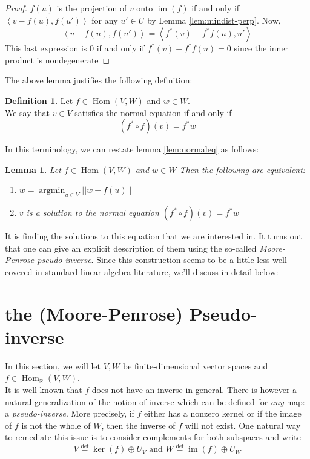 \documentclass{book}
\theoremstyle{plain}
\newtheorem{lemma}[corollary]{Lemma}
\theoremstyle{definition}
\newtheorem{definition}[corollary]{Definition}
\DeclareMathOperator{\argmin}{argmin}
\newcommand{\bl}[2]{\left\langle #1,#2\right\rangle}
\renewcommand{\d}[1]{\mathbb{#1}}
\newcommand{\define}{\stackrel{\operatorname{def}}{=}}
\newcommand{\ds}{\oplus}
\DeclareMathOperator{\Hom}{Hom}
\DeclareMathOperator{\im}{im}
\begin{document}
\begin{proof}
	$f(u)$ is the projection of $v$ onto $\im(f)$ if and only if $\bl{v-f(u)}{f(u')}$ for any $u' \in U$ by Lemma \ref{lem:mindist-perp}. Now,
	\[
	\bl{v-f(u)}{f(u')}=\bl{f^*(v)-f^*f(u)}{u'}
	\]
	This last expression is $0$ if and only if $f^*(v)-f^*f(u)=0$ since the inner product is nondegenerate
\end{proof}

The above lemma justifies the following definition:

\begin{definition}
	Let $f \in \Hom(V,W)$ and $w \in W$.\\ 
	We say that $v \in V$ satisfies the normal equation if and only if 
	\[
	(f^* \circ f)(v) = f^* w
	\]
\end{definition}
In this terminology, we can restate lemma \ref{lem:normaleq} as follows:
\begin{lemma}
	Let $f \in \Hom(V,W)$ and $w \in W$ Then the following are equivalent:
	\begin{enumerate}
		\item $w =\argmin_{u \in V}\vert \vert w-f(u)\vert \vert$
		\item $v$ is a solution to the normal equation $(f^* \circ f)(v) = f^* w$
	\end{enumerate}
\end{lemma}
\noindent It is finding the solutions to this equation that we are interested in. It turns out that one can give an explicit description of them using the so-called \emph{Moore-Penrose pseudo-inverse}. Since this construction seems to be a little less well covered in standard linear algebra literature, we'll discuss in detail below: 
\section{the (Moore-Penrose) Pseudo-inverse}

In this section, we will let $V, W$ be finite-dimensional vector spaces and $f \in \Hom_\d{R}(V,W)$.\\ It is well-known that $f$ does not have an inverse in general. There is however a natural generalization of the notion of inverse which can be defined for \emph{any} map: a \emph{pseudo-inverse}. More precisely, if $f$ either has  a nonzero kernel or if the image of $f$ is not the whole of $W$, then the inverse of $f$ will not exist. One natural way to remediate this issue is to consider complements for both subspaces and write 
\[V\define \ker(f)\ds U_V \textrm{ and } W\define \im(f)\ds U_W\]
\end{document}
